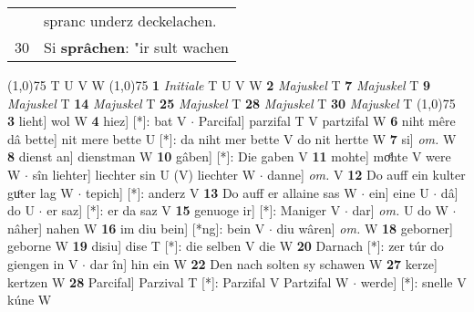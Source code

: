 \documentclass[8pt,a4paper,notitlepage]{article}
\begin{document}
\begin{table}[ht]
\begin{minipage}[t]{0.5\linewidth}
\begin{tabular}{rl}
 & spranc underz deckelachen.\\ 
30 & Si \textbf{sprâchen}: "ir sult wachen\\ 
\end{tabular}
\scriptsize
\line(1,0){75} \newline
T U V W \newline
\line(1,0){75} \newline
\textbf{1} \textit{Initiale} T U V W  \textbf{2} \textit{Majuskel} T  \textbf{7} \textit{Majuskel} T  \textbf{9} \textit{Majuskel} T  \textbf{14} \textit{Majuskel} T  \textbf{25} \textit{Majuskel} T  \textbf{28} \textit{Majuskel} T  \textbf{30} \textit{Majuskel} T  \newline
\line(1,0){75} \newline
\textbf{3} lieht] wol W \textbf{4} hiez] [*]: bat V  $\cdot$ Parcifal] parzifal T V partzifal W \textbf{6} niht mêre dâ bette] nit mere bette U [*]: da niht mer bette V do nit hertte W \textbf{7} si] \textit{om.} W \textbf{8} dienst an] dienstman W \textbf{10} gâben] [*]: Die gaben V \textbf{11} mohte] moͤhte V were W  $\cdot$ sîn liehter] liechter sin U (V) liechter W  $\cdot$ danne] \textit{om.} V \textbf{12} Do auff ein kulter guͦter lag W  $\cdot$ tepich] [*]: anderz V \textbf{13} Do auff er allaine sas W  $\cdot$ ein] eine U  $\cdot$ dâ] do U  $\cdot$ er saz] [*]: er da saz V \textbf{15} genuoge ir] [*]: Maniger V  $\cdot$ dar] \textit{om.} U do W  $\cdot$ nâher] nahen W \textbf{16} im diu bein] [*ng]: bein V  $\cdot$ diu wâren] \textit{om.} W \textbf{18} geborner] geborne W \textbf{19} disiu] dise T [*]: die selben V die W \textbf{20} Darnach [*]: zer túr do giengen in V  $\cdot$ dar în] hin ein W \textbf{22} Den nach solten sy schawen W \textbf{27} kerze] kertzen W \textbf{28} Parcifal] Parzival T [*]: Parzifal V Partzifal W  $\cdot$ werde] [*]: snelle V kúne W \newline
\end{minipage}
\end{table}
\end{document}
